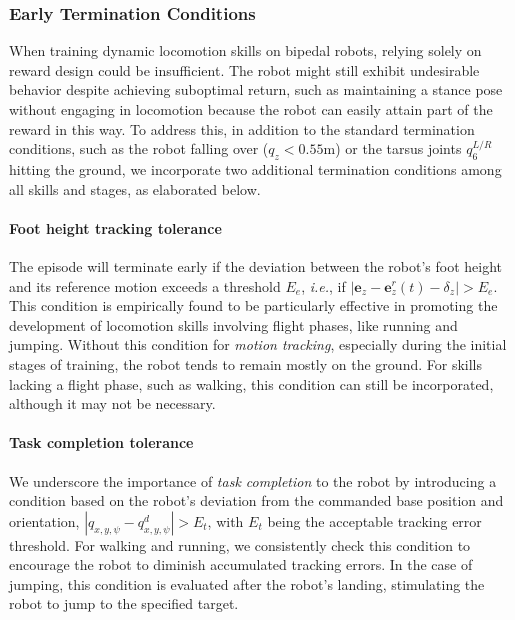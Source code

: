 \subsubsection{Early Termination Conditions}
When training dynamic locomotion skills on bipedal robots, relying solely on reward design could be insufficient. 
The robot might still exhibit undesirable behavior despite achieving suboptimal return, such as maintaining a stance pose without engaging in locomotion because the robot can easily attain part of the reward in this way. 
To address this, in addition to the standard termination conditions, such as the robot falling over ($q_z<0.55$m) or the tarsus joints $q_6^{L/R}$ hitting the ground, we incorporate two additional termination conditions among all skills and stages, as elaborated below. 

\paragraph{Foot height tracking tolerance}
The episode will terminate early if the deviation between the robot's foot height and its reference motion exceeds a threshold $E_e$, \textit{i.e.}, if $|\mathbf{e}_z - \mathbf{e}^r_z(t) - \delta_z| > E_e$. 
This condition is empirically found to be particularly effective in promoting the development of locomotion skills involving flight phases, like running and jumping. 
Without this condition for \textit{motion tracking}, especially during the initial stages of training, the robot tends to remain mostly on the ground.
For skills lacking a flight phase, such as walking, this condition can still be incorporated, although it may not be necessary.


\paragraph{Task completion tolerance}
We underscore the importance of \textit{task completion} to the robot by introducing a condition based on the robot's deviation from the commanded base position and orientation, $|q_{x,y,\psi} - q^d_{x,y,\psi}| > E_t$, with $E_t$ being the acceptable tracking error threshold.
For walking and running, we consistently check this condition to encourage the robot to diminish accumulated tracking errors. 
In the case of jumping, this condition is evaluated after the robot's landing, stimulating the robot to jump to the specified target.

